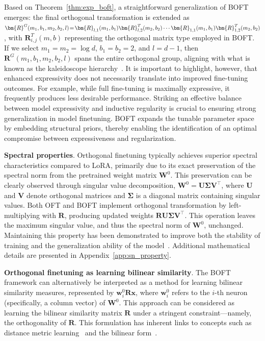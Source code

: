 Based on Theorem~\ref{thm:exp_boft}, a straightforward generalization of BOFT emerges: the final orthogonal transformation is extended as $\thickmuskip=2mu \medmuskip=2mu \bm{R}^G(m_1,b_1,m_2,b_2,l)=\bm{R}_{l,1}(m_1,b_1)\bm{R}_{l,2}^T(m_2,b_2)\cdots\bm{R}_{1,1}(m_1,b_1)\bm{R}_{1,2}^T(m_2,b_2)$, with $\bm{R}_{i,j}^T(m,b)$ representing the orthogonal matrix type employed in BOFT. If we select $m_1=m_2=\log d$, $b_1=b_2=2$, and $l=d-1$, then $\bm{R}^G(m_1,b_1,m_2,b_2,l)$ spans the entire orthogonal group, aligning with what is known as the kaleidoscope hierarchy~\cite{dao2019kaleidoscope}. It is important to highlight, however, that enhanced expressivity does not necessarily translate into improved fine-tuning outcomes. For example, while full fine-tuning is maximally expressive, it frequently produces less desirable performance. Striking an effective balance between model expressivity and inductive regularity is crucial to ensuring strong generalization in model finetuning. BOFT expands the tunable parameter space by embedding structural priors, thereby enabling the identification of an optimal compromise between expressiveness and regularization.

\textbf{Spectral properties}. Orthogonal finetuning typically achieves superior spectral characteristics compared to LoRA, primarily due to its exact preservation of the spectral norm from the pretrained weight matrix $\bm{W}^0$. This preservation can be clearly observed through singular value decomposition, $\bm{W}^0=\bm{U}\bm{\Sigma}\bm{V}^\top$, where $\bm{U}$ and $\bm{V}$ denote orthogonal matrices and $\bm{\Sigma}$ is a diagonal matrix containing singular values. Both OFT and BOFT implement orthogonal transformation by left-multiplying with $\bm{R}$, producing updated weights $\bm{R}\bm{U}\bm{\Sigma}\bm{V}^\top$. This operation leaves the maximum singular value, and thus the spectral norm of $\bm{W}^0$, unchanged. Maintaining this property has been demonstrated to improve both the stability of training and the generalization ability of the model~\cite{miyato2018spectral,yoshida2017spectral}. Additional mathematical details are presented in Appendix~\ref{app:sn_property}.

\textbf{Orthogonal finetuning as learning bilinear similarity}. The BOFT framework can alternatively be interpreted as a method for learning bilinear similarity measures, represented by $\bm{w}^0_i\bm{R}\bm{x}$, where $\bm{w}^0_i$ refers to the $i$-th neuron (specifically, a column vector) of $\bm{W}^0$. This approach can be considered as learning the bilinear similarity matrix $\bm{R}$ under a stringent constraint—namely, the orthogonality of $\bm{R}$. This formulation has inherent links to concepts such as distance metric learning~\cite{xing2002distance} and the bilinear form~\cite{roman2005advanced}.

